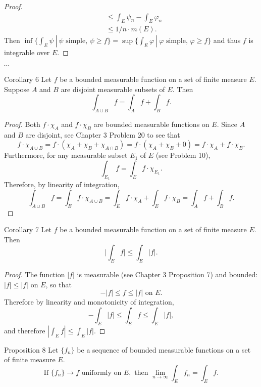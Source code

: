 \begin{flushleft}
\begin{proof}
\begin{align*}
            &\le\int_E\psi_n-\int_E\varphi_n\\
            &\le1/n\cdot m(E).       
        \end{align*}
        Then $\inf\{\int_E\psi\ |\ \psi\text{ simple, }\psi\ge f\}=\sup\{\int_E\varphi\ |\ \varphi\text{ simple, }\varphi\ge f\}$ and thus $f$ is integrable over $E$.
    \end{proof}
    $\cdots$\\\bigskip
    \begin{namedthm*}{Corollary 6}  
        Let $f$ be a bounded measurable function on a set of finite measure $E$.
        Suppose $A$ and $B$ are disjoint measurable subsets of $E$. 
        Then
        \[
            \int_{A\cup B}f=\int_Af+\int_Bf.
        \]   
    \end{namedthm*}
    \begin{proof}
        Both $f\cdot\chi_A$ and $f\cdot\chi_B$ are bounded measurable functions on $E$.
        Since $A$ and $B$ are disjoint, see Chapter 3 Problem 20 to see that
        \[
            f\cdot\chi_{A\cup B}=f\cdot(\chi_A+\chi_B+\chi_{A\cap B})=f\cdot(\chi_A+\chi_B+0)=f\cdot\chi_A+f\cdot\chi_B.    
        \]
        Furthermore, for any measurable subset $E_1$ of $E$ (see Problem 10),
        \[
            \int_{E_1}f=\int_{E}f\cdot\chi_{E_1}.    
        \]
        Therefore, by linearity of integration,
        \[
            \int_{A\cup B}f= \int_{E}f\cdot\chi_{A\cup B}=\int_{E}f\cdot\chi_{A}+\int_{E}f\cdot\chi_{B}=\int_Af+\int_Bf.
        \]
    \end{proof}
    \begin{namedthm*}{Corollary 7}
        Let $f$ be a bounded measurable function on a set of finite measure $E$.
        Then
        \[
            \biggl|\int_Ef\biggr|\le\int_E|f|.
        \]
    \end{namedthm*}
    \begin{proof}
        The function $|f|$ is measurable (see Chapter 3 Proposition 7) and bounded: $|f|\le|f|$ on $E$, so that
        \[
            -|f|\le f\le|f|\text{ on }E.
        \]
        Therefore by linearity and monotonicity of integration,
        \[
            -\int_E|f|\le \int_Ef\le\int_E|f|,
        \]
        and therefore $|\int_Ef|\le\int_E|f|$.
    \end{proof}
    \begin{namedthm*}{Proposition 8}
        Let $\{f_n\}$ be a sequence of bounded measurable functions on a set of finite measure $E$.
        \[
            \text{If }\{f_n\}\to f\text{ uniformly on }E,\text{ then }\lim_{n\to\infty}\int_Ef_n=\int_Ef.    
\]
\end{namedthm*}
\end{flushleft}

